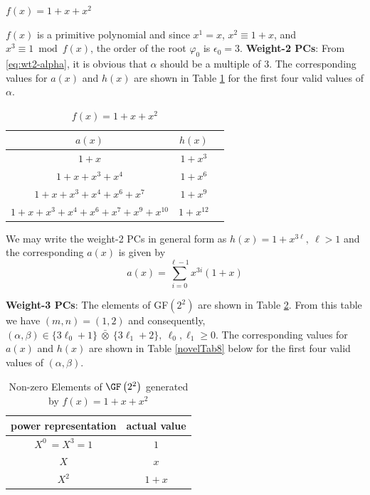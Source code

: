 \begin{example}$f(x)=1+x+x^2$

$f(x)$ is a primitive polynomial and since $x^1=x$, $x^2 \equiv 1+x$, and $x^3 \equiv 1 \bmod f(x)$, the order of the root $\varphi_0$ is $\epsilon_0=3$.\newline
\textbf{Weight-2 PCs}: 
 From \eqref{eq:wt2-alpha}, it is obvious that $\alpha$ should be a multiple of $3$. The corresponding values for $a(x)$ and $h(x)$ are shown in Table \ref{novelTab2} for the first four valid values of $\alpha$.
\begin{table}[htbp]
 \caption{$f(x)=1+x+x^2$}
\centering
 \begin{tabular}{c c c} 
 $a(x)$ & $h(x)$ \\ [0.5ex] 
 \hline\hline
$1+x$
 & $1+x^{3}$ \\
\hline
$1+x+x^3+x^4$
 & $1+x^{6}$ 
 \\
\hline
$1+x+x^3+x^4+x^6+x^{7}$ 
&  $1+x^{9}$ 
\\
\hline
$1+x+x^3+x^4+x^6+x^{7}+x^9+x^{10}$
 &  $1+x^{12}$ \\
 \end{tabular}
 \label{novelTab2}
\end{table}
We may write the weight-2 PCs in general form as $h(x)=1+x^{3\ell},~\ell>1$ and the corresponding $a(x)$ is given by 
\begin{equation*}
a(x)=\sum_{i=0}^{\ell-1} x^{3i}(1+x)
\end{equation*}

\textbf{Weight-3 PCs}: The elements of GF$(2^2)$ are shown in Table \ref{novelTab7}.  From this table we have $(m,n)= (1,2)$ and consequently, $(\alpha,\beta) \in \{3\ell_0+1\}~ \bar{\otimes}~\{3\ell_1+2\},~\ell_0,\ell_1 \geq 0$.  The corresponding values for $a(x)$ and $h(x)$ are shown in Table \ref{novelTab8} below for the first four valid values of $(\alpha,\beta)$.
 \begin{table}[htbp]
 \caption{Non-zero Elements of $\GF \left(2^2\right)$ generated by $f(x)=1+x+x^2$}
\centering
 \begin{tabular}{c c} 
 \hline
 power representation & actual value \\ [0.5ex] 
 \hline\hline
$X^0~=X^3=1$ & $1$\\
\hline
$X$ & $x$\\
\hline
$X^2$ &  $1+x$\\
\hline
 \end{tabular}
 \label{novelTab7}
\end{table}


\end{example}
